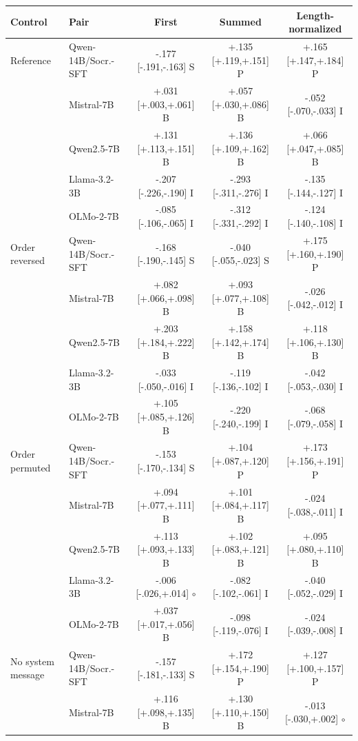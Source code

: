 \begin{table}[t]
\centering\scriptsize
\setlength{\tabcolsep}{3pt}
\begin{tabular}{@{}llccc@{}}
\toprule
Control & Pair & First & Summed & Length-normalized \\
\midrule
Reference & Qwen-14B/Socr.-SFT & -.177 [-.191,-.163] S & +.135 [+.119,+.151] P & +.165 [+.147,+.184] P \\
 & Mistral-7B & +.031 [+.003,+.061] B & +.057 [+.030,+.086] B & -.052 [-.070,-.033] I \\
 & Qwen2.5-7B & +.131 [+.113,+.151] B & +.136 [+.109,+.162] B & +.066 [+.047,+.085] B \\
 & Llama-3.2-3B & -.207 [-.226,-.190] I & -.293 [-.311,-.276] I & -.135 [-.144,-.127] I \\
 & OLMo-2-7B & -.085 [-.106,-.065] I & -.312 [-.331,-.292] I & -.124 [-.140,-.108] I \\
\addlinespace[1pt]
Order reversed & Qwen-14B/Socr.-SFT & -.168 [-.190,-.145] S & -.040 [-.055,-.023] S & +.175 [+.160,+.190] P \\
 & Mistral-7B & +.082 [+.066,+.098] B & +.093 [+.077,+.108] B & -.026 [-.042,-.012] I \\
 & Qwen2.5-7B & +.203 [+.184,+.222] B & +.158 [+.142,+.174] B & +.118 [+.106,+.130] B \\
 & Llama-3.2-3B & -.033 [-.050,-.016] I & -.119 [-.136,-.102] I & -.042 [-.053,-.030] I \\
 & OLMo-2-7B & +.105 [+.085,+.126] B & -.220 [-.240,-.199] I & -.068 [-.079,-.058] I \\
\addlinespace[1pt]
Order permuted & Qwen-14B/Socr.-SFT & -.153 [-.170,-.134] S & +.104 [+.087,+.120] P & +.173 [+.156,+.191] P \\
 & Mistral-7B & +.094 [+.077,+.111] B & +.101 [+.084,+.117] B & -.024 [-.038,-.011] I \\
 & Qwen2.5-7B & +.113 [+.093,+.133] B & +.102 [+.083,+.121] B & +.095 [+.080,+.110] B \\
 & Llama-3.2-3B & -.006 [-.026,+.014] $\circ$ & -.082 [-.102,-.061] I & -.040 [-.052,-.029] I \\
 & OLMo-2-7B & +.037 [+.017,+.056] B & -.098 [-.119,-.076] I & -.024 [-.039,-.008] I \\
\addlinespace[1pt]
No system message & Qwen-14B/Socr.-SFT & -.157 [-.181,-.133] S & +.172 [+.154,+.190] P & +.127 [+.100,+.157] P \\
 & Mistral-7B & +.116 [+.098,+.135] B & +.130 [+.110,+.150] B & -.013 [-.030,+.002] $\circ$ \\

\end{tabular}
\end{table}

